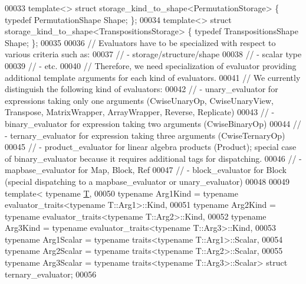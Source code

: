 \begin{DoxyCode}
00033 \textcolor{keyword}{template}<> \textcolor{keyword}{struct }storage\_kind\_to\_shape<PermutationStorage>     \{ \textcolor{keyword}{typedef} PermutationShape Shape;     \};
00034 \textcolor{keyword}{template}<> \textcolor{keyword}{struct }storage\_kind\_to\_shape<TranspositionsStorage>  \{ \textcolor{keyword}{typedef} TranspositionsShape Shape;  \};
00035 
00036 \textcolor{comment}{// Evaluators have to be specialized with respect to various criteria such as:}
00037 \textcolor{comment}{//  - storage/structure/shape}
00038 \textcolor{comment}{//  - scalar type}
00039 \textcolor{comment}{//  - etc.}
00040 \textcolor{comment}{// Therefore, we need specialization of evaluator providing additional template arguments for each kind of
       evaluators.}
00041 \textcolor{comment}{// We currently distinguish the following kind of evaluators:}
00042 \textcolor{comment}{// - unary\_evaluator    for expressions taking only one arguments (CwiseUnaryOp, CwiseUnaryView, Transpose,
       MatrixWrapper, ArrayWrapper, Reverse, Replicate)}
00043 \textcolor{comment}{// - binary\_evaluator   for expression taking two arguments (CwiseBinaryOp)}
00044 \textcolor{comment}{// - ternary\_evaluator   for expression taking three arguments (CwiseTernaryOp)}
00045 \textcolor{comment}{// - product\_evaluator  for linear algebra products (Product); special case of binary\_evaluator because it
       requires additional tags for dispatching.}
00046 \textcolor{comment}{// - mapbase\_evaluator  for Map, Block, Ref}
00047 \textcolor{comment}{// - block\_evaluator    for Block (special dispatching to a mapbase\_evaluator or unary\_evaluator)}
00048 
00049 \textcolor{keyword}{template}< \textcolor{keyword}{typename} \hyperlink{group___sparse_core___module_class_eigen_1_1_triplet}{T},
00050           \textcolor{keyword}{typename} Arg1Kind   = \textcolor{keyword}{typename} evaluator\_traits<typename T::Arg1>::Kind,
00051           \textcolor{keyword}{typename} Arg2Kind   = \textcolor{keyword}{typename} evaluator\_traits<typename T::Arg2>::Kind,
00052           \textcolor{keyword}{typename} Arg3Kind   = \textcolor{keyword}{typename} evaluator\_traits<typename T::Arg3>::Kind,
00053           \textcolor{keyword}{typename} Arg1Scalar = \textcolor{keyword}{typename} traits<typename T::Arg1>::Scalar,
00054           \textcolor{keyword}{typename} Arg2Scalar = \textcolor{keyword}{typename} traits<typename T::Arg2>::Scalar,
00055           \textcolor{keyword}{typename} Arg3Scalar = \textcolor{keyword}{typename} traits<typename T::Arg3>::Scalar> \textcolor{keyword}{struct }ternary\_evaluator;
00056 

\end{DoxyCode}
